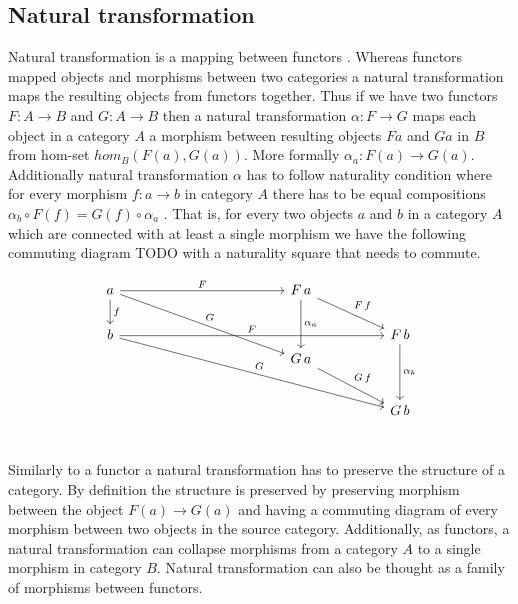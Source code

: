 \documentclass[article]{aaltoseries}
\begin{document}
  \subsection{Natural transformation}
    Natural transformation is a mapping between functors \cite{computational,
      barr1990category, mac2013categories}. Whereas functors mapped objects
    and morphisms between two categories a natural transformation maps the resulting
    objects from functors together. Thus if we have two functors $F: A \rightarrow B$ and
    $G: A \rightarrow B$ then a natural transformation $\alpha: F \rightarrow G$ maps each object in a
    category $A$ a morphism between resulting objects $F a$ and $G a$ in $B$ from
    hom-set $hom_B(F(a), G(a))$. More formally $\alpha_a: F(a) \rightarrow G(a)$. Additionally
    natural transformation $\alpha$ has to follow naturality condition where for every
    morphism $f: a \rightarrow b$ in category $A$ there has to be equal compositions $\alpha_b \circ
    F(f) = G(f) \circ \alpha_a$ \cite{barr1990category, computational,
      eilenberg1945general}. That is, for every two objects $a$ and $b$ in a
    category $A$ which are connected with at least a single morphism we have the
    following commuting diagram TODO with a naturality square that needs
    to commute.
    
    \[
      \begin{tikzcd}[column sep=huge]
        a \arrow[r, "F"] \arrow[d, "f"] \arrow[ddr, "G"]
        &[7em] F\, a \arrow[dd, "\alpha_a"] \arrow[dr, "F\, f"]
        & \\
        b \arrow[rr, "F"] \arrow[ddrr, "G"]
        &
        & F\, b \arrow[dd, "\alpha_b"] \\
        [-1.5em]
        & G\, a \arrow[dr, "G\, f"]
        & \\
        [0.5em]
        &
        & G\, b \\
      \end{tikzcd}
    \]

    Similarly to a functor a natural transformation has to preserve the
    structure of a category. By definition the structure is preserved by
    preserving morphism between the object $F(a) \rightarrow G(a)$ and having a commuting
    diagram of every morphism between two objects in the source category.
    Additionally, as functors, a natural transformation can collapse morphisms
    from a category $A$ to a single morphism in category $B$. Natural transformation
    can also be thought as a family of morphisms between functors.
 
\end{document}
